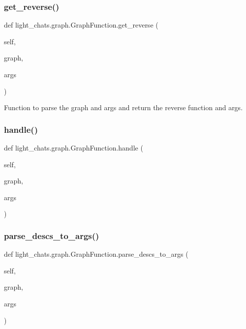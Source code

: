 \subsubsection{\texorpdfstring{get\+\_\+reverse()}{get\_reverse()}}
{\footnotesize\ttfamily def light\+\_\+chats.\+graph.\+Graph\+Function.\+get\+\_\+reverse (\begin{DoxyParamCaption}\item[{}]{self,  }\item[{}]{graph,  }\item[{}]{args }\end{DoxyParamCaption})}

\begin{DoxyVerb}Function to parse the graph and args and return the reverse function and args.
\end{DoxyVerb}
 \mbox{\label{classlight__chats_1_1graph_1_1GraphFunction_a21e2dd1c8eb431b3ee22cce4853e3c15}} 
\subsubsection{\texorpdfstring{handle()}{handle()}}
{\footnotesize\ttfamily def light\+\_\+chats.\+graph.\+Graph\+Function.\+handle (\begin{DoxyParamCaption}\item[{}]{self,  }\item[{}]{graph,  }\item[{}]{args }\end{DoxyParamCaption})}

\mbox{\label{classlight__chats_1_1graph_1_1GraphFunction_a8b76e8a8bb07f75abd081e220683dbd4}} 
\subsubsection{\texorpdfstring{parse\+\_\+descs\+\_\+to\+\_\+args()}{parse\_descs\_to\_args()}}
{\footnotesize\ttfamily def light\+\_\+chats.\+graph.\+Graph\+Function.\+parse\+\_\+descs\+\_\+to\+\_\+args (\begin{DoxyParamCaption}\item[{}]{self,  }\item[{}]{graph,  }\item[{}]{args }\end{DoxyParamCaption})}

